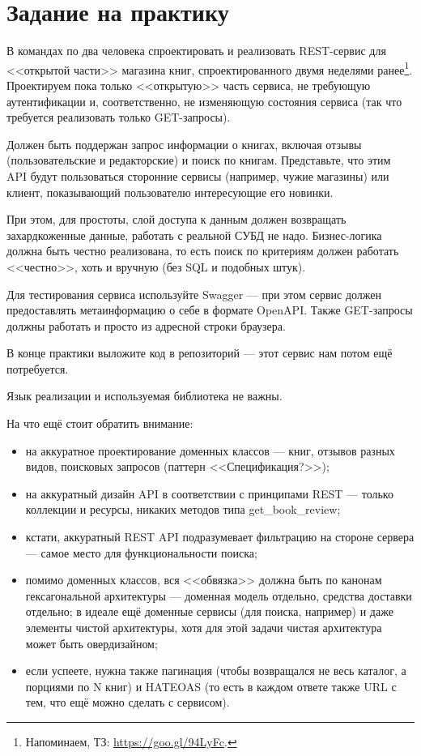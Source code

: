 \documentclass{../mcstext}
\begin{document}
\maketitle
\thispagestyle{empty}

\section{Задание на практику}

В командах по два человека спроектировать и реализовать REST-сервис для <<открытой части>> магазина книг, спроектированного двумя неделями ранее\footnote{Напоминаем, ТЗ: \url{https://goo.gl/94LyFc}.}. Проектируем пока только <<открытую>> часть сервиса, не требующую аутентификации и, соответственно, не изменяющую состояния сервиса (так что требуется реализовать только GET-запросы).

Должен быть поддержан запрос информации о книгах, включая отзывы (пользовательские и редакторские) и поиск по книгам. Представьте, что этим API будут пользоваться сторонние сервисы (например, чужие магазины) или клиент, показывающий пользователю интересующие его новинки.

При этом, для простоты, слой доступа к данным должен возвращать захардкоженные данные, работать с реальной СУБД не надо. Бизнес-логика должна быть честно реализована, то есть поиск по критериям должен работать <<честно>>, хоть и вручную (без SQL и подобных штук).

Для тестирования сервиса используйте Swagger --- при этом сервис должен предоставлять метаинформацию о себе в формате OpenAPI. Также GET-запросы должны работать и просто из адресной строки браузера.

В конце практики выложите код в репозиторий --- этот сервис нам потом ещё потребуется.

Язык реализации и используемая библиотека не важны.

На что ещё стоит обратить внимание:

\begin{itemize}
    \item на аккуратное проектирование доменных классов --- книг, отзывов разных видов, поисковых запросов (паттерн <<Спецификация?>>);
    \item на аккуратный дизайн API в соответствии с принципами REST --- только коллекции и ресурсы, никаких методов типа get\_book\_review;
    \item кстати, аккуратный REST API подразумевает фильтрацию на стороне сервера --- самое место для функциональности поиска;
    \item помимо доменных классов, вся <<обвязка>> должна быть по канонам гексагональной архитектуры --- доменная модель отдельно, средства доставки отдельно; в идеале ещё доменные сервисы (для поиска, например) и даже элементы чистой архитектуры, хотя для этой задачи чистая архитектура может быть овердизайном;
    \item если успеете, нужна также пагинация (чтобы возвращался не весь каталог, а порциями по N книг) и HATEOAS (то есть в каждом ответе также URL с тем, что ещё можно сделать с сервисом).
\end{itemize}
\end{document}
